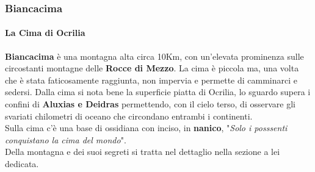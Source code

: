 \documentclass[10pt,twoside,onecolumn,openany]{book}
\begin{document}
\subsubsection{Biancacima}
\paragraph{La Cima di Ocrilia} \textbf{Biancacima} è una montagna alta circa 10Km, con un'elevata prominenza sulle circostanti montagne delle \textbf{Rocce di Mezzo}. La cima è piccola ma, una volta che è stata faticosamente raggiunta, non impervia e permette di camminarci e sedersi. Dalla cima si nota bene la superficie piatta di Ocrilia, lo sguardo supera i confini di \textbf{Aluxias e Deidras} permettendo, con il cielo terso, di osservare gli svariati chilometri di oceano che circondano entrambi i continenti.\\
Sulla cima c'è una base di ossidiana con inciso, in \textbf{nanico}, "\textit{Solo i posssenti conquistano la cima del mondo}".\\
Della montagna e dei suoi segreti si tratta nel dettaglio nella sezione a lei dedicata.
\end{document}
